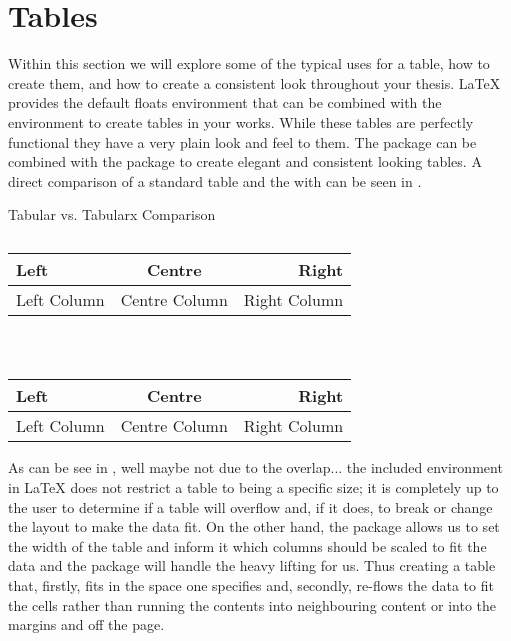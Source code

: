 	\section{Tables}
		Within this section we will explore some of the typical uses for a table, how to create them, and how to create a consistent look throughout your thesis.
		\LaTeX{} provides the default floats environment  that can be combined with the  environment to create tables in your works. 
		While these tables are perfectly functional they have a very plain look and feel to them.
		The package  can be combined with the  package to create elegant and consistent looking tables.
		A direct comparison of a standard table and the  with  can be seen in .
		\begin{table}[H]
			\caption{Tabular vs. Tabularx Comparison}
			\label{tab:tableComparison}
			\centering
			\begin{subtable}{0.45\linewidth}
				\caption{}
				\label{tab:tableComparison:b}
				\begin{tabular}{lcr} 
					\hline
						\textbf{Left} & \textbf{Centre} & \textbf{Right}\\%
					\hline
						Left Column & Centre Column & Right Column \\%
					\hline
				\end{tabular}
			\end{subtable}
			~
			\begin{subtable}{0.45\linewidth}
				\caption{}
				\label{tab:tableComparison:a}
				\begin{tabularx}{\linewidth}{LCR} 
					\toprule
						\textbf{Left} & \textbf{Centre} & \textbf{Right}\\
					\midrule
						Left Column & Centre Column & Right Column \\
					\bottomrule
				\end{tabularx}
			\end{subtable}
		\end{table}
		As can be see in , well maybe not due to the overlap... the included  environment in \LaTeX{} does not restrict a table to being a specific size; it is completely up to the user to determine if a table will overflow and, if it does, to break or change the layout to make the data fit.
		On the other hand, the  package allows us to set the width of the table and inform it which columns should be scaled to fit the data and the  package will handle the heavy lifting for us.
		Thus creating a table that, firstly, fits in the space one specifies and, secondly, re-flows the data to fit the cells rather than running the contents into neighbouring content or into the margins and off the page.
  
